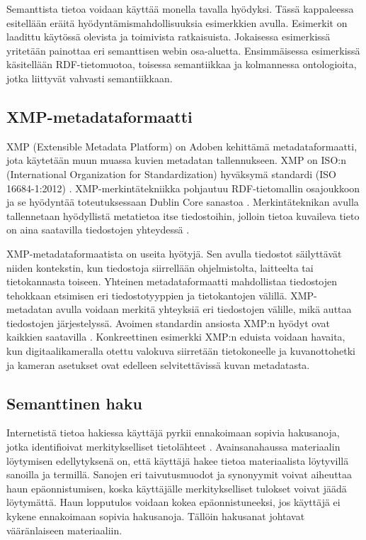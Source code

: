 \documentclass[finnish, 12pt, a4paper, elec, utf8, pdfa, online]{aaltothesis}
\begin{document}
{Semanttista tietoa voidaan käyttää monella tavalla hyödyksi. Tässä kappaleessa esitellään eräitä hyödyntämismahdollisuuksia esimerkkien avulla. Esimerkit on laadittu käytössä olevista ja toimivista ratkaisuista. Jokaisessa esimerkissä yritetään painottaa eri semanttisen webin osa-aluetta. Ensimmäisessa esimerkissä käsitellään RDF-tietomuotoa, toisessa semantiikkaa ja kolmannessa ontologioita, jotka liittyvät vahvasti semantiikkaan.


\subsection{XMP-metadataformaatti}
XMP (Extensible Metadata Platform) on Adoben kehittämä metadataformaatti, jota käytetään muun muassa kuvien metadatan tallennukseen. XMP on ISO:n (International Organization for Standardization) hyväksymä standardi (ISO 16684-1:2012) \cite{XMP_standard}. XMP-merkintätekniikka pohjautuu RDF-tietomallin osajoukkoon ja se hyödyntää toteutuksessaan Dublin Core sanastoa \cite{XMP2}. Merkintäteknikan avulla tallennetaan hyödyllistä metatietoa itse tiedostoihin, jolloin tietoa kuvaileva tieto on aina saatavilla tiedostojen yhteydessä \cite{XMP1}.

XMP-metadataformaatista on useita hyötyjä. Sen avulla tiedostot säilyttävät niiden kontekstin, kun tiedostoja siirrellään ohjelmistolta, laitteelta tai tietokannasta toiseen. Yhteinen metadataformaatti mahdollistaa tiedostojen tehokkaan etsimisen eri tiedostotyyppien ja tietokantojen välillä. XMP-metadatan avulla voidaan merkitä yhteyksiä eri tiedostojen välille, mikä auttaa tiedostojen järjestelyssä. Avoimen standardin ansiosta XMP:n hyödyt ovat kaikkien saatavilla \cite{XMP_overall}. Konkreettinen esimerkki XMP:n eduista voidaan havaita, kun digitaalikameralla otettu valokuva siirretään tietokoneelle ja kuvanottohetki ja kameran asetukset
ovat edelleen selvitettävissä kuvan metadatasta.

\subsection{Semanttinen haku}

Internetistä tietoa hakiessa käyttäjä pyrkii ennakoimaan sopivia hakusanoja, jotka identifioivat merkitykselliset tietolähteet \cite{keyword_search}. Avainsanahaussa materiaalin löytymisen edellytyksenä on, että käyttäjä hakee tietoa materiaalista löytyvillä sanoilla ja termillä. Sanojen eri taivutusmuodot ja synonyymit voivat aiheuttaa haun epäonnistumisen, koska käyttäjälle merkitykselliset tulokset voivat jäädä löytymättä. Haun lopputulos voidaan kokea epäonnistuneeksi, jos käyttäjä ei kykene ennakoimaan sopivia hakusanoja. Tällöin hakusanat johtavat vääränlaiseen materiaaliin.

}
\end{document}
